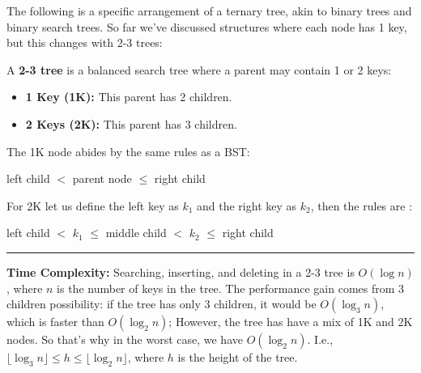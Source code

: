 \noindent
The following is a specific arrangement of a ternary tree, akin to binary trees and binary search trees. So 
far we've discussed structures where each node has 1 key, but this changes with 2-3 trees:
\begin{Def}

    A \textbf{2-3 tree} is a balanced search tree where a parent may contain 1 or 2 keys:
    \begin{itemize}
        \item \textbf{1 Key (1K):} This parent has 2 children.
        \item \textbf{2 Keys (2K):} This parent has 3 children.
    \end{itemize}
    \noindent
    The 1K node abides by the same rules as a BST:
    \begin{center}
        left child $<$ parent node $\leq$ right child
    \end{center}
    \noindent
    For 2K let us define the left key as $k_1$ and the right key as $k_2$, then the rules are :
    \begin{center}
        left child $<$ $k_1$ $\leq$ middle child $<$ $k_2$ $\leq$ right child
    \end{center}
    \noindent
    \rule{\textwidth}{0.4pt}
    \textbf{Time Complexity:} Searching, inserting, and deleting in a 2-3 tree is $O(\log n)$, where $n$ is the number of keys in the tree.
    The performance gain comes from 3 children possibility: if the tree has only 3 children, it would be 
    $O(\log_3 n)$, which is faster than $O(\log_2 n)$; However, the tree has have a mix of 1K and 2K nodes.
    So that's why in the worst case, we have $O(\log_2 n)$. I.e., $\lfloor{\log_3 n}\rfloor \leq h \leq \lfloor{\log_2 n}\rfloor$, where $h$ is the height of the tree.
\end{Def}
\newpage